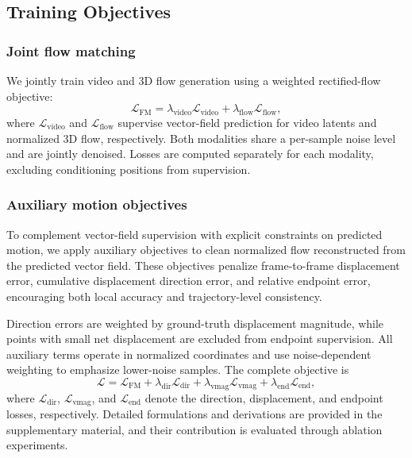 \subsection{Training Objectives}
\label{sec:training}

\subsubsection{Joint flow matching}
We jointly train video and 3D flow generation using
a weighted rectified-flow objective:
\begin{equation}
\mathcal{L}_{\mathrm{FM}}
=
\lambda_{\mathrm{video}}\mathcal{L}_{\mathrm{video}}
+
\lambda_{\mathrm{flow}}\mathcal{L}_{\mathrm{flow}},
\label{eq:joint-objective}
\end{equation}
where $\mathcal{L}_{\mathrm{video}}$ and
$\mathcal{L}_{\mathrm{flow}}$ supervise vector-field
prediction for video latents and normalized 3D flow,
respectively.
Both modalities share a per-sample noise level and
are jointly denoised.
Losses are computed separately for each modality,
excluding conditioning positions from supervision.

\subsubsection{Auxiliary motion objectives}
To complement vector-field supervision with explicit
constraints on predicted motion, we apply auxiliary
objectives to clean normalized flow reconstructed
from the predicted vector field.
These objectives penalize frame-to-frame displacement
error, cumulative displacement direction error,
and relative endpoint error, encouraging both local
accuracy and trajectory-level consistency.

Direction errors are weighted by ground-truth displacement
magnitude, while points with small net displacement
are excluded from endpoint supervision.
All auxiliary terms operate in normalized coordinates
and use noise-dependent weighting to emphasize
lower-noise samples.
The complete objective is
\begin{equation}
\mathcal{L}
=
\mathcal{L}_{\mathrm{FM}}
+
\lambda_{\mathrm{dir}}\mathcal{L}_{\mathrm{dir}}
+
\lambda_{\mathrm{vmag}}\mathcal{L}_{\mathrm{vmag}}
+
\lambda_{\mathrm{end}}\mathcal{L}_{\mathrm{end}},
\label{eq:complete-objective}
\end{equation}
where $\mathcal{L}_{\mathrm{dir}}$,
$\mathcal{L}_{\mathrm{vmag}}$, and
$\mathcal{L}_{\mathrm{end}}$ denote the direction,
displacement, and endpoint losses, respectively.
Detailed formulations and derivations are provided
in the supplementary material, and their contribution
is evaluated through ablation experiments.